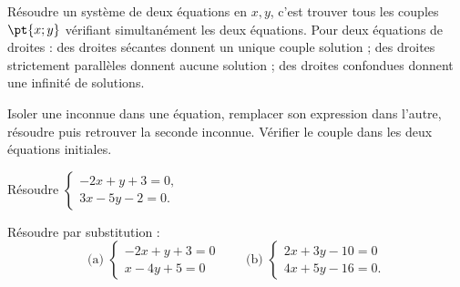 \begin{keypoint}[Définition]
Résoudre un système de deux équations en $x,y$, c'est trouver tous les couples $\pt{x;y}$ vérifiant simultanément les deux équations. Pour deux équations de droites : des droites sécantes donnent un unique couple solution ; des droites strictement parallèles donnent aucune solution ; des droites confondues donnent une infinité de solutions.
\end{keypoint}
\begin{method}[Substitution]
Isoler une inconnue dans une équation, remplacer son expression dans l'autre, résoudre puis retrouver la seconde inconnue. Vérifier le couple dans les deux équations initiales.
\end{method}
\begin{example}Résoudre $\begin{cases}-2x+y+3=0,\\3x-5y-2=0.\end{cases}$\end{example}
\begin{example}Résoudre par substitution :
\[\text{(a) }\begin{cases}-2x+y+3=0\\x-4y+5=0\end{cases}\qquad
\text{(b) }\begin{cases}2x+3y-10=0\\4x+5y-16=0.\end{cases}\]\end{example}

